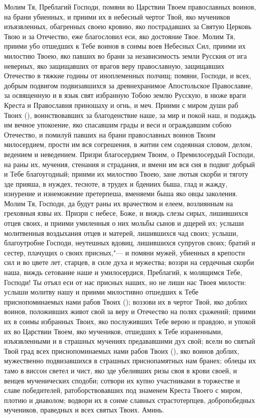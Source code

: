 \begin{mymulticols}
Молим Тя, Преблагий Господи, помяни во Царствии Твоем православных воинов, на брани убиенных, и приими их в небесный чертог Твой, яко мучеников изъязвленных, обагренных своею кровию, яко пострадавших за Святую Церковь Твою и за Отечество, еже благословил еси, яко достояние Твое. Молим Тя, приими убо отшедших к Тебе воинов в сонмы воев Небесных Сил, приими их милостию Твоею, яко павших во брани за независимость земли Русския от ига неверных, яко защищавших от врагов веру православную, защищавших Отечество в тяжкие годины от иноплеменных полчищ; помяни, Господи, и всех, добрым подвигом подвизавшихся за древнехранимое Апостольское Православие, за освященную и в язык свят избранную Тобою землю Русскую, в нюже враги Креста и Православия приношаху и огнь, и меч. Приими с миром души раб Твоих (), воинствовавших за благоденствие наше, за мир и покой наш, и подаждь им вечное упокоение, яко спасавшим грады и веси и ограждавшим собою Отечество, и помилуй павших на брани православных воинов Твоим милосердием, прости им вся согрешения, в житии сем содеянная словом, делом, ведением и неведением. Призри благосердием Твоим, о Премилосердый Господи, на раны их, мучения, стенания и страдания, и вмени им вся сия в подвиг добрый и Тебе благоугодный; приими их милостию Твоею, зане лютыя скорби и тяготу зде прияша, в нуждех, тесноте, в трудех и бдениих быша, глад и жажду, изнурение и изнеможение претерпеша, вменяеми быша яко овцы заколения. Молим Тя, Господи, да будут раны их врачеством и елеем, возлиянным на греховныя язвы их. Призри с небесе, Боже, и виждь слезы сирых, лишившихся отцев своих, и приими умиленныя о них мольбы сынов и дщерей их; услыши молитвенныя воздыхания отцев и матерей, лишившихся чад своих; услыши, благоутробне Господи, неутешных вдовиц, лишившихся супругов своих; братий и сестер, плачущих о своих присных,"--- и помяни мужей, убиенных в крепости сил и во цвете лет, старцев, в силе духа и мужества; воззри на сердечныя скорби наша, виждь сетование наше и умилосердися, Преблагий, к молящимся Тебе, Господи! Ты отъял еси от нас присных наших, но не лиши нас Твоея милости: услыши молитву нашу и приими милостивно отшедших к Тебе приснопоминаемых нами рабов Твоих (); воззови их в чертог Твой, яко доблих воинов, положивших живот свой за веру и Отечество на полях сражений; приими их в сонмы избранных Твоих, яко послуживших Тебе верою и правдою, и упокой их во Царствии Твоем, яко мучеников, отшедших к Тебе израненными, изъязвленными и в страшных мучениях предававшими дух свой; всели во святый Твой град всех приснопоминаемых нами рабов Твоих (), яко воинов доблих, мужественно подвизавшихся в страшных приснопамятных нам бранех; облецы их тамо в виссон светел и чист, яко зде убеливших ризы своя в крови своей, и венцев мученических сподоби; сотвори их купно участниками в торжестве и славе победителей, ратоборствовавших под знаменем Креста Твоего с миром, плотию и диаволом; водвори их в сонме славных страстотерпцев, добропобедных мучеников, праведных и всех святых Твоих. Аминь. 

\end{mymulticols}

